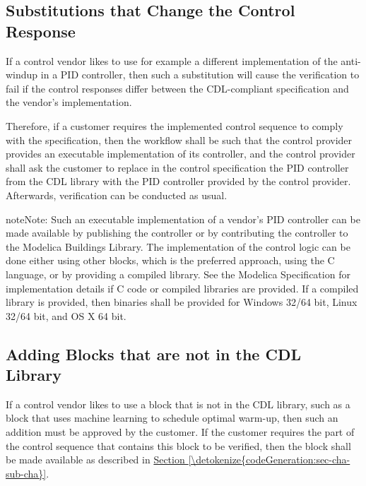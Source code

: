 \documentclass[letterpaper,10pt, openany,english]{sphinxmanual}
\begin{document}
\subsection{Substitutions that Change the Control Response}
\label{\detokenize{codeGeneration:substitutions-that-change-the-control-response}}\label{\detokenize{codeGeneration:sec-cha-sub-cha}}
If a control vendor likes to use for example a different implementation of
the anti-windup in a PID controller, then such a substitution
will cause the verification to fail if the control responses differ
between the CDL-compliant specification and the vendor’s implementation.

Therefore, if a customer requires the implemented control sequence to comply
with the specification, then the workflow shall be such that
the control provider provides an executable implementation of its controller,
and the control provider shall ask the customer to replace
in the control specification the PID controller from the CDL library with the PID controller
provided by the control provider. Afterwards, verification can be conducted as usual.

\begin{sphinxadmonition}{note}{Note:}
Such an executable implementation of a vendor’s PID controller can
be made available by publishing the controller
or by contributing the controller to the Modelica Buildings Library.
The implementation of the control logic can be done either
using other  blocks, which is the preferred approach,
using the C language, or by providing
a compiled library. See the Modelica Specification 
for implementation details
if C code or compiled libraries are provided.
If a compiled library is provided, then binaries shall be provided for
Windows 32/64 bit, Linux 32/64 bit, and OS X 64 bit.
\end{sphinxadmonition}


\subsection{Adding Blocks that are not in the CDL Library}
\label{\detokenize{codeGeneration:adding-blocks-that-are-not-in-the-cdl-library}}
If a control vendor likes to use a block that is not in the CDL library,
such as a block that uses machine learning to schedule optimal warm-up,
then such an addition must be approved by the customer.
If the customer requires the part of the control sequence that contains this
block to be verified, then the block shall be made available as described in \hyperref[\detokenize{codeGeneration:sec-cha-sub-cha}]{Section \ref{\detokenize{codeGeneration:sec-cha-sub-cha}}}.
\end{document}
